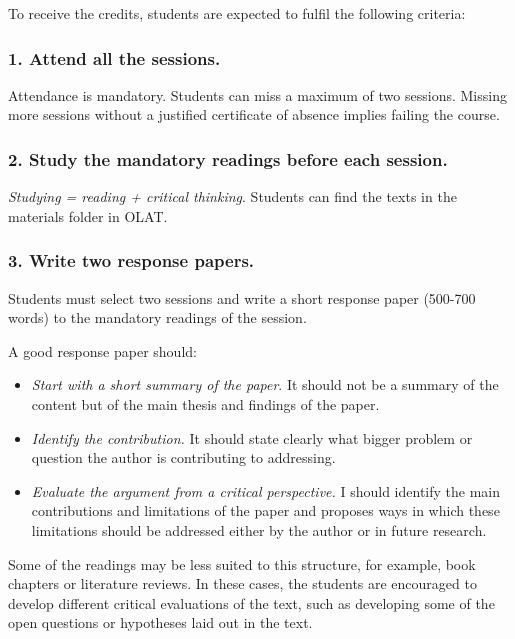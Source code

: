\documentclass[
  12pt,
]{article}
\begin{document}
To receive the credits, students are expected to fulfil the following
criteria:

\hypertarget{attend-all-the-sessions.}{%
\subsubsection{1. Attend all the
sessions.}\label{attend-all-the-sessions.}}

Attendance is mandatory. Students can miss a maximum of two sessions.
Missing more sessions without a justified certificate of absence implies
failing the course.

\hypertarget{study-the-mandatory-readings-before-each-session.}{%
\subsubsection{2. Study the mandatory readings before each
session.}\label{study-the-mandatory-readings-before-each-session.}}

\emph{Studying = reading + critical thinking}. Students can find the
texts in the materials folder in OLAT.

\hypertarget{write-two-response-papers.}{%
\subsubsection{3. Write two response
papers.}\label{write-two-response-papers.}}

Students must select two sessions and write a short response paper
(500-700 words) to the mandatory readings of the session.

A good response paper should:

\begin{itemize}
\item
  \emph{Start with a short summary of the paper}. It should not be a
  summary of the content but of the main thesis and findings of the
  paper.
\item
  \emph{Identify the contribution.} It should state clearly what bigger
  problem or question the author is contributing to addressing.
\item
  \emph{Evaluate the argument from a critical perspective.} I should
  identify the main contributions and limitations of the paper and
  proposes ways in which these limitations should be addressed either by
  the author or in future research.
\end{itemize}

Some of the readings may be less suited to this structure, for example,
book chapters or literature reviews. In these cases, the students are
encouraged to develop different critical evaluations of the text, such
as developing some of the open questions or hypotheses laid out in the
text.
\end{document}
